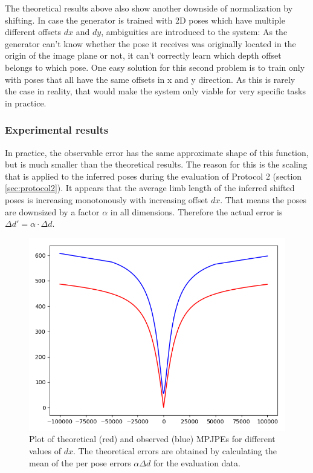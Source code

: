 The theoretical results above also show another downside of normalization by shifting.
In case the generator is trained with 2D poses which have multiple different offsets $dx$ and $dy$, ambiguities are introduced to the system:
As the generator can't know whether the pose it receives was originally located in the origin of the image plane or not, it can't correctly learn which depth offset belongs to which pose.
One easy solution for this second problem is to train only with poses that all have the same offsets in x and y direction.
As this is rarely the case in reality, that would make the system only viable for very specific tasks in practice.


\subsubsection{Experimental results}
In practice, the observable error has the same approximate shape of this function, but is much smaller than the theoretical results.
The reason for this is the scaling that is applied to the inferred poses during the evaluation of Protocol 2 (section \ref{sec:protocol2}).
It appears that the average limb length of the inferred shifted poses is increasing monotonously with increasing offset $dx$.
That means the poses are downsized by a factor $\alpha$ in all dimensions. 
 Therefore the actual error is $\Delta d' = \alpha \cdot \Delta d$.

\begin{figure}[ht]
	
	\centering
	\includegraphics[scale=0.5]{images/x_shift_error.png}
	\caption{Plot of theoretical (red) and observed (blue) MPJPEs for different values of $dx$. 
		The theoretical errors are obtained by calculating the mean of the per pose errors $\alpha \Delta d$ for the evaluation data.}
	\label{fig:x-shift-error}
\end{figure}

